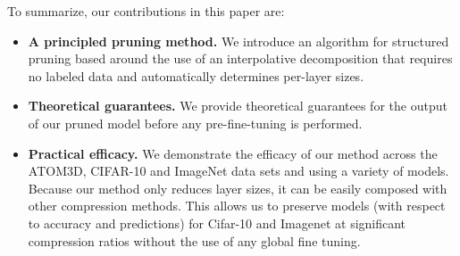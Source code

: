 To summarize, our contributions in this paper are:
\begin{itemize}[leftmargin=*]
    \item[] \textbf{A principled pruning method.} We introduce an algorithm for structured pruning based around the use of an interpolative decomposition that requires no labeled data and automatically determines per-layer sizes.   
    \item[] \textbf{Theoretical guarantees.} We provide theoretical guarantees for the output of our pruned model before any pre-fine-tuning is performed. 
    \item[] \textbf{Practical efficacy.}  We demonstrate the efficacy of our method across the ATOM3D, CIFAR-10 and ImageNet data sets and using a variety of models.  Because our method only reduces layer sizes, it can be easily composed with other
    compression 
    methods. This allows us to preserve models (with respect to accuracy and predictions) for Cifar-10 and Imagenet at significant compression ratios without the use of any global fine tuning.
    
    
\end{itemize}
 
